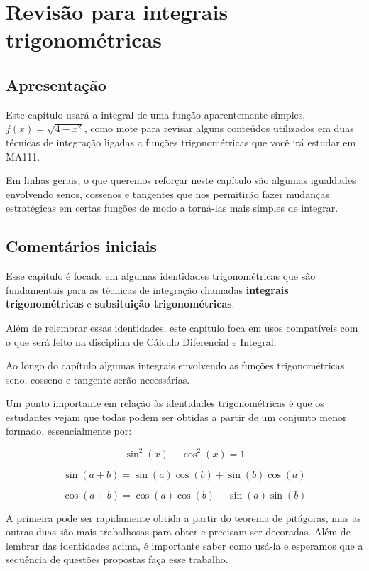 \documentclass[main_estudante.tex]{subfiles}
\begin{document}
\paraAmbos

\chapter{Revisão para integrais trigonométricas}

\section{Apresentação}

Este capítulo usará a integral de uma função aparentemente simples, $f(x)=\sqrt{4-x^2}$, como mote para revisar alguns conteúdos utilizados em duas técnicas de integração ligadas a funções trigonométricas que você irá estudar em MA111.

Em linhas gerais, o que queremos reforçar neste capítulo são algumas igualdades envolvendo senos, cossenos e tangentes que nos permitirão fazer mudanças estratégicas em certas funções de modo a torná-las mais simples de integrar.

\paraTutores

\section{Comentários iniciais}

Esse capítulo é focado em algumas identidades trigonométricas que são fundamentais para as técnicas de integração chamadas \textbf{integrais trigonométricas} e \textbf{subsituição trigonométricas}.

Além de relembrar essas identidades, este capítulo foca em usos compatíveis com o que será feito na disciplina de Cálculo Diferencial e Integral.

Ao longo do capítulo algumas integrais envolvendo as funções trigonométricas seno, cosseno e tangente serão necessárias.

Um ponto importante em relação às identidades trigonométricas é que os estudantes vejam que todas podem ser obtidas a partir de um conjunto menor formado, essencialmente por:

$$\sin^2(x)+\cos^2(x)=1$$

$$\sin(a+b)=\sin(a)\cos(b)+\sin(b)\cos(a)$$

$$\cos(a+b)=\cos(a)\cos(b)-\sin(a)\sin(b) $$

A primeira pode ser rapidamente obtida a partir do teorema de pitágoras, mas as outras duas são mais trabalhosas para obter e precisam ser decoradas. Além de lembrar das identidades acima, é importante saber como usá-la e esperamos que a sequência de questões propostas faça esse trabalho.
\end{document}
